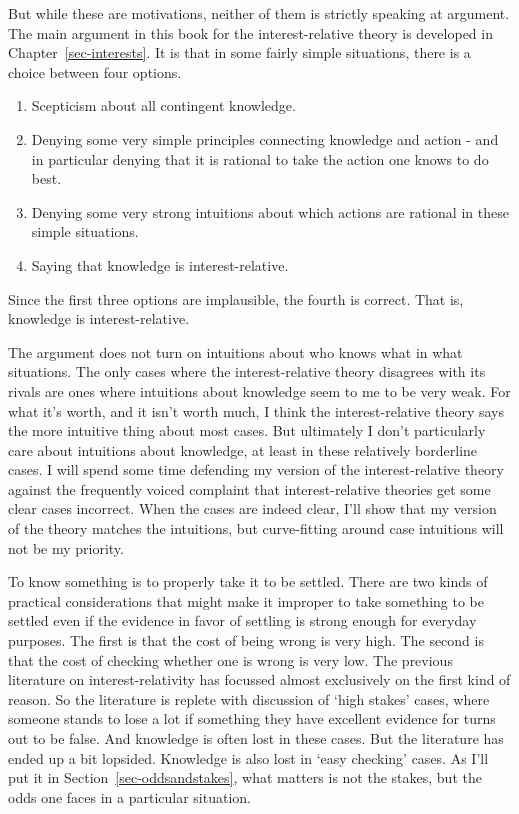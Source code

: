 \documentclass[
  12pt,
  letterpaper,
]{scrbook}
\providecommand{\tightlist}{%
  \setlength{\itemsep}{0pt}\setlength{\parskip}{0pt}}\usepackage{longtable,booktabs,array}
\begin{document}
But while these are motivations, neither of them is strictly speaking at
argument. The main argument in this book for the interest-relative
theory is developed in Chapter~\ref{sec-interests}. It is that in some
fairly simple situations, there is a choice between four options.

\begin{enumerate}
\def\labelenumi{\arabic{enumi}.}
\tightlist
\item
  Scepticism about all contingent knowledge.
\item
  Denying some very simple principles connecting knowledge and action -
  and in particular denying that it is rational to take the action one
  knows to do best.
\item
  Denying some very strong intuitions about which actions are rational
  in these simple situations.
\item
  Saying that knowledge is interest-relative.
\end{enumerate}

Since the first three options are implausible, the fourth is correct.
That is, knowledge is interest-relative.

The argument does not turn on intuitions about who knows what in what
situations. The only cases where the interest-relative theory disagrees
with its rivals are ones where intuitions about knowledge seem to me to
be very weak. For what it's worth, and it isn't worth much, I think the
interest-relative theory says the more intuitive thing about most cases.
But ultimately I don't particularly care about intuitions about
knowledge, at least in these relatively borderline cases. I will spend
some time defending my version of the interest-relative theory against
the frequently voiced complaint that interest-relative theories get some
clear cases incorrect. When the cases are indeed clear, I'll show that
my version of the theory matches the intuitions, but curve-fitting
around case intuitions will not be my priority.

To know something is to properly take it to be settled. There are two
kinds of practical considerations that might make it improper to take
something to be settled even if the evidence in favor of settling is
strong enough for everyday purposes. The first is that the cost of being
wrong is very high. The second is that the cost of checking whether one
is wrong is very low. The previous literature on interest-relativity has
focussed almost exclusively on the first kind of reason. So the
literature is replete with discussion of `high stakes' cases, where
someone stands to lose a lot if something they have excellent evidence
for turns out to be false. And knowledge is often lost in these cases.
But the literature has ended up a bit lopsided. Knowledge is also lost
in `easy checking' cases. As I'll put it in
Section~\ref{sec-oddsandstakes}, what matters is not the stakes, but the
odds one faces in a particular situation.
\end{document}
